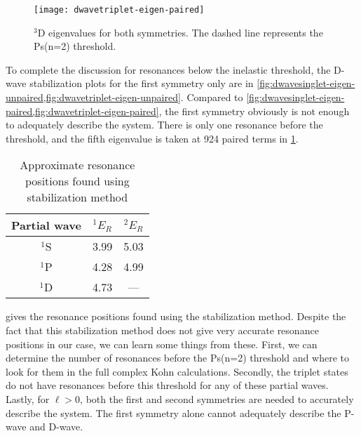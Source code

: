 \documentclass[Dissertation.tex]{subfiles}
\begin{document}
\begin{figure}[H]
	\centering
	\texttt{[image: dwavetriplet-eigen-paired]}
	\caption[$^3$D eigenvalues for both symmetries]{$^3$D eigenvalues for both symmetries. The dashed line represents the Ps(n=2) threshold.}
	\label{fig:dwavetriplet-eigen-paired}
\end{figure}

To complete the discussion for resonances below the inelastic threshold, the D-wave stabilization plots for the first symmetry only are in \cref{fig:dwavesinglet-eigen-unpaired,fig:dwavetriplet-eigen-unpaired}. Compared to \cref{fig:dwavesinglet-eigen-paired,fig:dwavetriplet-eigen-paired}, the first symmetry obviously is not enough to adequately describe the system. There is only one resonance before the threshold, and the fifth eigenvalue is taken at 924 paired terms in \cref{tab:Stabilization}.


\begin{table}[H]
\centering
\begin{tabular}{c c c}
\toprule
Partial wave & $^1E_R$ & $^2E_R$ \\
\midrule
$^1$S & 3.99 & 5.03  \\
$^1$P & 4.28 & 4.99  \\
$^1$D & 4.73 & ---   \\
\bottomrule
\end{tabular}
\caption{Approximate resonance positions found using stabilization method}
\label{tab:Stabilization}
\end{table}

 gives the resonance positions found using the stabilization method. Despite the fact that this stabilization method does not give very accurate resonance positions in our case, we can learn some things from these. First, we can determine the number of resonances before the Ps(n=2) threshold and where to look for them in the full complex Kohn calculations. Secondly, the triplet states do not have resonances before this threshold for any of these partial waves. Lastly, for $\ell > 0$, both the first and second symmetries are needed to accurately describe the system. The first symmetry alone cannot adequately describe the P-wave and D-wave.



%
%
\end{document}
